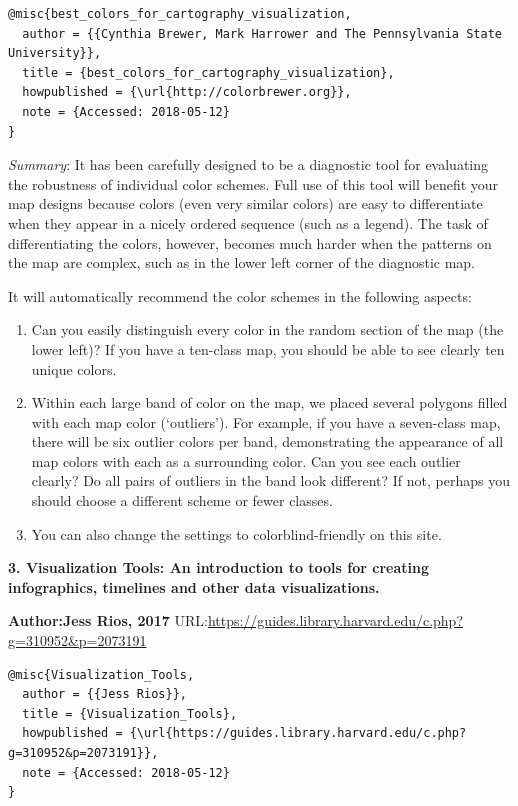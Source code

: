 \documentclass[]{book}
\theoremstyle{definition}
\theoremstyle{definition}
\theoremstyle{definition}
\theoremstyle{remark}
\begin{document}
\begin{verbatim}
@misc{best_colors_for_cartography_visualization,
  author = {{Cynthia Brewer, Mark Harrower and The Pennsylvania State University}},
  title = {best_colors_for_cartography_visualization},
  howpublished = {\url{http://colorbrewer.org}},
  note = {Accessed: 2018-05-12}
}
\end{verbatim}

\emph{Summary}: It has been carefully designed to be a diagnostic tool
for evaluating the robustness of individual color schemes. Full use of
this tool will benefit your map designs because colors (even very
similar colors) are easy to differentiate when they appear in a nicely
ordered sequence (such as a legend). The task of differentiating the
colors, however, becomes much harder when the patterns on the map are
complex, such as in the lower left corner of the diagnostic map.

It will automatically recommend the color schemes in the following
aspects:

\begin{enumerate}
\def\labelenumi{\arabic{enumi}.}
\item
  Can you easily distinguish every color in the random section of the
  map (the lower left)? If you have a ten-class map, you should be able
  to see clearly ten unique colors.
\item
  Within each large band of color on the map, we placed several polygons
  filled with each map color (`outliers'). For example, if you have a
  seven-class map, there will be six outlier colors per band,
  demonstrating the appearance of all map colors with each as a
  surrounding color. Can you see each outlier clearly? Do all pairs of
  outliers in the band look different? If not, perhaps you should choose
  a different scheme or fewer classes.
\item
  You can also change the settings to colorblind-friendly on this site.
\end{enumerate}

\textbf{3. Visualization Tools: An introduction to tools for creating
infographics, timelines and other data visualizations.}
\citep{viz_tools}

\textbf{Author:Jess Rios, 2017}
URL:\url{https://guides.library.harvard.edu/c.php?g=310952\&p=2073191}
\citep{Visualization_Tools}

\begin{verbatim}
@misc{Visualization_Tools,
  author = {{Jess Rios}},
  title = {Visualization_Tools},
  howpublished = {\url{https://guides.library.harvard.edu/c.php?g=310952&p=2073191}},
  note = {Accessed: 2018-05-12}
}
\end{verbatim}
\end{document}
